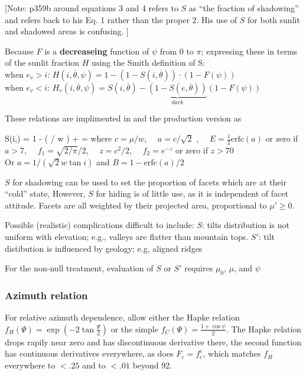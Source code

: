 \documentclass{article}
\newcommand{\erfc}{\mathrm{erfc}}  %
\begin{document}
[Note:   p359b around equations 3 and 4 refers to $S$ as ``the fraction of shadowing'' and refers back to his Eq. 1 rather than the proper 2. His use of $S$  for both sunlit and shadowed areas is confusing. ]

Because $F$ is a \textbf{decreaseing} function of $\psi$  from 0 to $\pi$;
 expressing these in terms of the sunlit fraction $H$ using the Smith definition of S:
\\ when $e_v>i$: $H(i,\overline{\theta},\psi)= 1- \left( 1-S(i,\overline{\theta})  \right)\cdot \left( 1-F(\psi) \right) $
\\ when $e_v<i$: $H_v(i,\overline{\theta},\psi)=S(i,\overline{\theta}) -\underbrace{\left( 1-S(e,\overline{\theta}) \right)}_{dark} \left( 1-F(\psi) \right) $


These relations are implimented in  and the production version
 as

\qb S(i,\overline{\theta}) =  \frac{ 1- \frac{1}{2} \erfc \left( \mu / \sqrt{2} w \right) } 
{1  -  \erfc \left(  \mu /  w \right) 
+   }
=   
\qe
where $c=\mu/w$, \ \ $a=c/\sqrt{2}$ , \ \ $E= \frac{1}{2} \erfc \left( a \right)$ or zero if $a>7$, \ \  $f_1= \sqrt{2/\pi}/2 $, \ \ $z=c^2/2$, \ \ $f_2= e^{-z}$ or zero if $z > 70$
\\ Or $a=1/(\sqrt{2}w \tan i)$ and $B=1-\erfc(a)/2$


$S$ for shadowing can be used to set the proportion of facets which are at their
``cold'' state, However, $S$ for hiding is of little use, as it is independent
of facet attitude. Facets are all weighted by their projected area, proportional
to $\mu' \geq 0 $.

Possible (realistic) complications difficult to include:
\qi $S$: tilts distribution is not uniform with elevation; e.g., valleys are flatter than mountain tops. 
\qi $S'$: tilt distibution is influenced by geology; e.g, aligned ridges

For the non-null treatment, evaluation of $S$ or $S'$ requires $\mu_0$, $\mu$,
and $\psi$

\subsubsection{Azimuth relation \label{azi} }  %

For relative azimuth dependence, allow either the Hapke relation $f_H(\Psi)=\exp
  \left( -2 \tan \frac{\Psi}{2} \right)$ or the simple  $f_C(\Psi)=\frac{1+ \cos \psi}{2}$. The Hapke relation drops rapily near zero and has discontinuous derivative there, the second function has continuous derivatives everywhere, as does $F_e=f_c^e$, which matches $f_H$ everywhere to $<.25$ and to $< .01$ beyond 92\qd.
\end{document}
